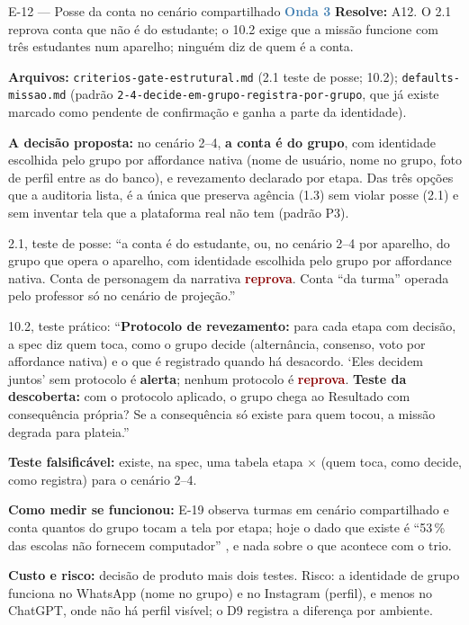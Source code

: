 \documentclass[11pt,a4paper]{article}
\newcommand{\rep}{\textcolor{DarkRed}{\textbf{reprova}}}
\newcommand{\alerta}{\textcolor{DarkYellow}{\textbf{alerta}}}
\newcommand{\onda}[1]{\textcolor{SteelBlue}{\textbf{Onda #1}}}
\begin{document}
\begin{emendabox}{E-12 --- Posse da conta no cenário compartilhado \hfill \onda{3}}
\textbf{Resolve:} A12. O 2.1 reprova conta que não é do estudante; o 10.2 exige que a missão
funcione com três estudantes num aparelho; ninguém diz de quem é a conta.

\textbf{Arquivos:} \texttt{criterios-gate-estrutural.md} (2.1 teste de posse; 10.2);
\texttt{defaults-missao.md} (padrão \texttt{2-4-decide-em-grupo-registra-por-grupo}, que já
existe marcado como pendente de confirmação e ganha a parte da identidade).

\textbf{A decisão proposta:} no cenário 2--4, \textbf{a conta é do grupo}, com identidade escolhida
pelo grupo por affordance nativa (nome de usuário, nome no grupo, foto de perfil entre as do
banco), e revezamento declarado por etapa. Das três opções que a auditoria lista, é a única que
preserva agência (1.3) sem violar posse (2.1) e sem inventar tela que a plataforma real não tem
(padrão P3).

\begin{depoisbox}\small
2.1, teste de posse: ``a conta é do estudante, ou, no cenário 2--4 por aparelho, do grupo que opera
o aparelho, com identidade escolhida pelo grupo por affordance nativa. Conta de personagem da
narrativa \rep{}. Conta ``da turma'' operada pelo professor só no cenário de projeção.''

10.2, teste prático: ``\textbf{Protocolo de revezamento:} para cada etapa com decisão, a spec diz
quem toca, como o grupo decide (alternância, consenso, voto por affordance nativa) e o que é
registrado quando há desacordo. `Eles decidem juntos' sem protocolo é \alerta; nenhum protocolo é
\rep. \textbf{Teste da descoberta:} com o protocolo aplicado, o grupo chega ao Resultado com
consequência própria? Se a consequência só existe para quem tocou, a missão degrada para
plateia.''
\end{depoisbox}

\textbf{Teste falsificável:} existe, na spec, uma tabela etapa $\times$ (quem toca, como decide,
como registra) para o cenário 2--4.

\textbf{Como medir se funcionou:} E-19 observa turmas em cenário compartilhado e conta quantos do
grupo tocam a tela por etapa; hoje o dado que existe é ``53\,\% das escolas não fornecem
computador'' \cite{ticedu2024}, e nada sobre o que acontece com o trio.

\textbf{Custo e risco:} decisão de produto mais dois testes. Risco: a identidade de grupo
funciona no WhatsApp (nome no grupo) e no Instagram (perfil), e menos no ChatGPT, onde não há
perfil visível; o D9 registra a diferença por ambiente.
\end{emendabox}
\end{document}
